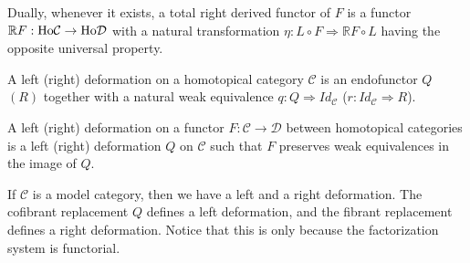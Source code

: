 \documentclass[../thesis.tex]{subfiles}
\begin{document}
\begin{definition}
                Dually, whenever it exists, a total right derived functor of $F$ is a functor $\mathbb{R}F:\tt{Ho}\mathcal{C}\rightarrow \tt{Ho}\mathcal{D}$ with a natural transformation $\eta: L\circ F \Rightarrow \mathbb{R}F \circ L$ having the opposite universal property.
                \begin{center}
                    \qquad
                \end{center}
            \end{definition}

            \begin{definition}[Deformation]
                A left (right) deformation on a homotopical category $\mathcal{C}$ is an endofunctor $Q$ $(R)$ together with a natural weak equivalence $q: Q \Rightarrow Id_\mathcal{C}$ ($r: Id_\mathcal{C}\Rightarrow R$).

                A left (right) deformation on a functor $F:\mathcal{C}\rightarrow\mathcal{D}$ between homotopical categories is a left (right) deformation $Q$ on $\mathcal{C}$ such that $F$ preserves weak equivalences in the image of $Q$.
            \end{definition}

            \begin{remark}
                If $\mathcal{C}$ is a model category, then we have a left and a right deformation. The cofibrant replacement $Q$ defines a left deformation, and the fibrant replacement defines a right deformation. Notice that this is only because the factorization system is functorial.
            \end{remark}
\end{document}
